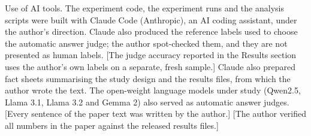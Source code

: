 Use of AI tools. The experiment code, the experiment runs and the analysis scripts were built with Claude Code
(Anthropic), an AI coding assistant, under the author's direction. Claude also produced the reference labels used to
choose the automatic answer judge; the author spot-checked them, and they are not presented as human labels.
[The judge accuracy reported in the Results section uses the author's own labels on a separate, fresh sample.]
Claude also prepared fact sheets summarising the study design and the results files, from which the author wrote the
text. The open-weight language models under study (Qwen2.5, Llama 3.1, Llama 3.2 and Gemma 2) also served as automatic %
answer judges. [Every sentence of the paper text was written by the author.] [The author verified all numbers in the
paper against the released results files.]
